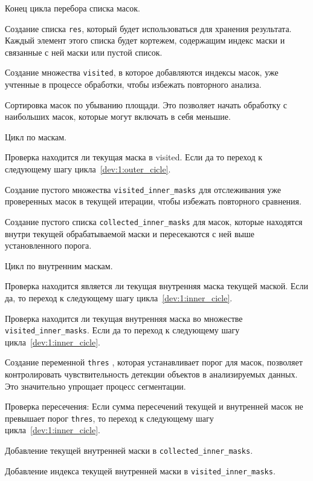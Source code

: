 \begin{enumerate_step}
    \item Конец цикла перебора списка масок.
    \item Создание списка \lstinline{res}, который будет использоваться для хранения результата. Каждый элемент этого списка будет кортежем, содержащим индекс маски и связанные с ней маски или пустой список. 
    \item Создание множества \lstinline{visited}, в которое добавляются индексы масок, уже учтенные в процессе обработки, чтобы избежать повторного анализа.
    \item Сортировка масок по убыванию площади. Это позволяет начать обработку с наибольших масок, которые могут включать в себя меньшие.
    \item \label{dev:1:outer_cicle} Цикл по маскам.
    \item Проверка находится ли текущая маска в visited. Если да то переход к следующему шагу цикла~\ref{dev:1:outer_cicle}.
    \item Создание пустого множества \lstinline{visited_inner_masks} для отслеживания уже проверенных масок в текущей итерации, чтобы избежать повторного сравнения.
    \item Создание пустого списка \lstinline{collected_inner_masks} для масок, которые находятся внутри текущей обрабатываемой маски и пересекаются с ней выше установленного порога.
    \item \label{dev:1:inner_cicle} Цикл по внутренним маскам.
    \item Проверка находится является ли текущая внутренняя маска текущей маской. Если да, то переход к следующему шагу цикла~\ref{dev:1:inner_cicle}.
    \item Проверка находится ли текущая внутренняя маска во множестве \lstinline{visited_inner_masks}. Если да то переход к следующему шагу цикла~\ref{dev:1:inner_cicle}.
    \item Создание переменной \lstinline{thres} , которая устанавливает порог для масок, позволяет контролировать чувствительность детекции объектов в анализируемых данных. Это значительно упрощает процесс сегментации.
    \item Проверка пересечения: Если сумма пересечений текущей и внутренней масок не превышает порог \lstinline{thres}, то переход к следующему шагу цикла~\ref{dev:1:inner_cicle}.
    \item Добавление текущей внутренней маски в \lstinline{collected_inner_masks}.
    \item Добавление индекса текущей внутренней маски в \lstinline{visited_inner_masks}.

\end{enumerate_step}

